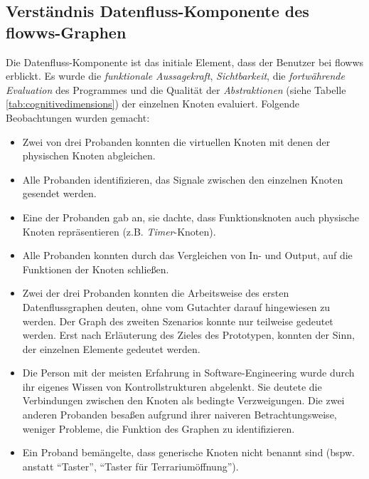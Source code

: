\subsection*{Verständnis Datenfluss-Komponente des flowws-Graphen}
Die Datenfluss-Kom\-po\-nen\-te ist das initiale Element, dass der Benutzer bei flowws erblickt. Es wurde die \textit{funktionale Aussagekraft}, \textit{Sichtbarkeit}, die \textit{fortwährende Evaluation} des Programmes und die Qualität der \textit{Abstraktionen} (siehe Tabelle \ref{tab:cognitivedimensions}) der einzelnen Knoten evaluiert. Folgende Beobachtungen wurden gemacht: 
\begin{itemize}
    \item Zwei von drei Probanden konnten die virtuellen Knoten mit denen der physischen Knoten abgleichen.
    \item Alle Probanden identifizieren, das Signale zwischen den einzelnen Knoten gesendet werden.
    \item Eine der Probanden gab an, sie dachte, dass Funktionsknoten auch physische Knoten repräsentieren (z.B. \textit{Timer}-Knoten).
    \item Alle Probanden konnten durch das Vergleichen von In- und Output, auf die Funktionen der Knoten schließen.
    \item Zwei der drei Probanden konnten die Arbeitsweise des ersten Datenflussgraphen deuten, ohne vom Gutachter darauf hingewiesen zu werden. Der Graph des zweiten Szenarios konnte nur teilweise gedeutet werden. Erst nach Erläuterung des Zieles des Prototypen, konnten der Sinn, der einzelnen Elemente gedeutet werden. 
    \item Die Person mit der meisten Erfahrung in Software-Engineering wurde durch ihr eigenes Wissen von Kontrollstrukturen abgelenkt. Sie deutete die Verbindungen zwischen den Knoten als bedingte Verzweigungen. Die zwei anderen Probanden besaßen aufgrund ihrer naiveren Betrachtungsweise, weniger Probleme, die Funktion des Graphen zu identifizieren.
    \item Ein Proband bemängelte, dass generische Knoten nicht benannt sind (bspw. anstatt "`Taster"', "`Taster für Terrariumöffnung"').
\end{itemize}

